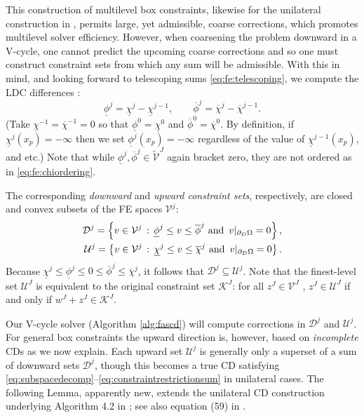 \documentclass[review,hidelinks,onefignum,onetabnum]{siamart220329}
\begin{document}
This construction of multilevel box constraints, likewise for the unilateral construction in \cite{GraeserKornhuber2009}, permits large, yet admissible, coarse corrections, which promotes multilevel solver efficiency.  However, when coarsening the problem downward in a V-cycle, one cannot predict the upcoming coarse corrections and so one must construct constraint sets from which any sum will be admissible.  With this in mind, and looking forward to telescoping sums \eqref{eq:fe:telescoping}, we compute the LDC differences \cite{GraeserKornhuber2009}:
\begin{equation}
\underline{\phi}^j = \underline{\chi}^j - \underline{\chi}^{j-1}, \qquad \overline{\phi}^j = \overline{\chi}^j - \overline{\chi}^{j-1}.  \label{eq:fe:philevels}
\end{equation}
(Take $\underline{\chi}^{-1}=\overline{\chi}^{-1}=0$ so that $\underline{\phi}^0=\underline{\chi}^0$ and $\overline{\phi}^0=\overline{\chi}^0$.  By definition, if $\underline{\chi}^j(x_p)=-\infty$ then we set $\underline{\phi}^j(x_p)=-\infty$ regardless of the value of $\underline{\chi}^{j-1}(x_p)$, and etc.)  Note that while $\underline{\phi}^{j},\overline{\phi}^{j} \in \tilde{\mathcal{V}}^J$ again bracket zero, they are not ordered as in \eqref{eq:fe:chiordering}.

The corresponding \emph{downward} and \emph{upward constraint sets}, respectively, are closed and convex subsets of the FE spaces $\mathcal{V}^j$:
\begin{align}
\mathcal{D}^j = \left\{v \in \mathcal{V}^j \,:\, \underline{\phi}^j \le v \le \overline{\phi}^j \text{ and } \, v|_{\partial_D\Omega} = 0\right\}, \label{eq:fe:constraintsets} \\
\mathcal{U}^j = \left\{v \in \mathcal{V}^j \,:\, \underline{\chi}^j \le v \le \overline{\chi}^j \text{ and } \, v|_{\partial_D\Omega} = 0\right\}. \notag
\end{align}
Because $\underline{\chi}^j \le \underline{\phi}^j \le 0 \le \overline{\phi}^j \le \overline{\chi}^j$, it follows that $\mathcal{D}^j \subseteq \mathcal{U}^j$.  Note that the finest-level set $\mathcal{U}^J$ is equivalent to the original constraint set $\mathcal{K}^J$: for all $z^J \in \mathcal{V}^J$ , $z^J \in \mathcal{U}^J$ if and only if $w^J+z^J \in \mathcal{K}^J$.

Our V-cycle solver (Algorithm \ref{alg:fascd}) will compute corrections in $\mathcal{D}^j$ and $\mathcal{U}^j$.  For general box constraints the upward direction is, however, based on \emph{incomplete} CDs as we now explain.  Each upward set $\mathcal{U}^j$ is generally only a superset of a sum of downward sets $\mathcal{D}^j$, though this becomes a true CD satisfying \eqref{eq:subspacedecomp}--\eqref{eq:constraintrestrictionsum} in unilateral cases.  The following Lemma, apparently new, extends the unilateral CD construction underlying Algorithm 4.2 in \cite{GraeserKornhuber2009}; see also equation (59) in \cite{Tai2003}.
\end{document}
